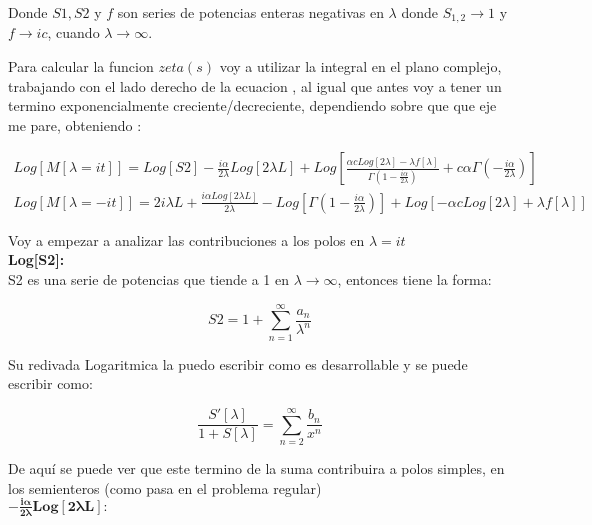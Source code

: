 Donde $S1,S2$ y $f$ son series de potencias enteras negativas en $\lambda$ donde $S _{1,2} \rightarrow 1$ y $f \rightarrow i c$, cuando $\lambda \rightarrow \infty$.

Para calcular la funcion $zeta (s) $ voy a utilizar la integral en el plano complejo, trabajando con el lado derecho de la ecuacion , al igual que antes voy a tener un termino exponencialmente creciente/decreciente, dependiendo sobre que que eje me pare, obteniendo : 

\begin{equation}
\begin{array}{c}
Log[M[\lambda = i t]] = 
Log[S2] - 
\frac{i \alpha}{2 \lambda} Log[2 \lambda L] + %
Log[
	\frac{\alpha c Log[2 \lambda] - \lambda f[\lambda] }{\Gamma (1- \frac{i \alpha}{ 2 \lambda})} + 
	c \alpha \Gamma (- \frac{i \alpha}{2 \lambda}) ] \\ 
Log[M[\lambda = - i t]] = 
2 i \lambda L +
\frac{i \alpha Log[2 \lambda L]}{2 \lambda} -
Log[\Gamma (1- \frac{i \alpha}{2 \lambda}) ] +
Log[
	- \alpha c Log[2 \lambda] +
	\lambda f[\lambda]
	]
\end{array}
\end{equation}


Voy a empezar a analizar las contribuciones a los polos en $\lambda = i t$ \\

\textbf{Log[S2]:} \\

S2 es una serie de potencias que tiende a 1 en $\lambda \rightarrow \infty$, entonces tiene la forma:

\begin{equation}
S2 = 1 + \sum _{n=1} ^{\infty} \frac{a _n}{\lambda ^n}
\end{equation}

Su redivada Logaritmica la puedo escribir como es desarrollable y se puede escribir como:

\begin{equation}
\frac{S' [\lambda]}{1+ S[ \lambda ]} = \sum _{n=2} ^{\infty} \frac{b _n }{x ^n}
\end{equation}

De aquí se puede ver que este termino de la suma contribuira a polos simples, en los semienteros (como pasa en el problema regular) \\

$\mathbf{
- \frac{i \alpha}{2 \lambda} Log[2 \lambda L]} : 
$ \\

